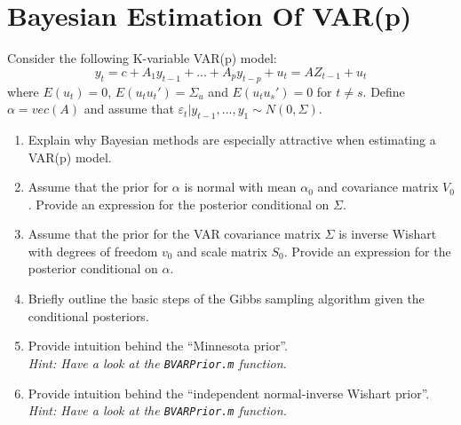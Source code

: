 \documentclass[a4paper]{scrartcl}
\begin{document}
    \newpage
    \section{Bayesian Estimation Of VAR(p)}
    Consider the following K-variable VAR(p) model:
    $$y_t = c + A_1 y_{t-1} + ... + A_p y_{t-p} + u_t= AZ_{t-1} + u_t$$ where $E(u_t)=0$, $E(u_t u_t')=\Sigma_{u}$ and $E(u_t u_s')=0$ for $t\neq s$. Define $\alpha = vec(A)$ and assume that $\varepsilon_t|y_{t-1},...,y_1\sim N(0,\Sigma)$.
    \begin{enumerate}
        \item Explain why Bayesian methods are especially attractive when estimating a VAR(p) model.
        \item Assume that the prior for $\alpha$ is normal with mean $\alpha_0$ and covariance matrix $V_0$. Provide an expression for the posterior conditional on $\Sigma$.
        \item Assume that the prior for the VAR covariance matrix $\Sigma$ is inverse Wishart with degrees of freedom $v_0$ and scale matrix $S_0$. Provide an expression for the posterior conditional on $\alpha$.
        \item Briefly outline the basic steps of the Gibbs sampling algorithm given the conditional posteriors.
        \item Provide intuition behind the \enquote{Minnesota prior}.\\\emph{Hint: Have a look at the \texttt{BVARPrior.m} function.}
        \item Provide intuition behind the \enquote{independent normal-inverse Wishart prior}.\\\emph{Hint: Have a look at the \texttt{BVARPrior.m} function.}
    \end{enumerate}
    
    \newpage
    
\end{document}
